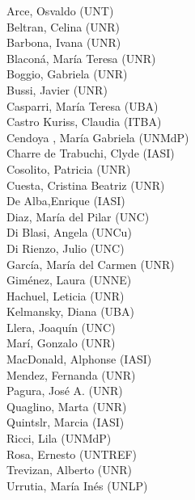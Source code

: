 \vspace{1cm}

{}
\bigbreak
\noindent Arce, Osvaldo (UNT) \\
Beltran, Celina (UNR) \\
Barbona, Ivana (UNR) \\
Blaconá, María Teresa (UNR) \\
Boggio, Gabriela (UNR) \\
Bussi, Javier (UNR) \\
Casparri, María Teresa (UBA) \\
Castro Kuriss, Claudia (ITBA) \\
Cendoya , María Gabriela (UNMdP) \\
Charre de Trabuchi, Clyde (IASI) \\
Cosolito, Patricia (UNR) \\
Cuesta, Cristina Beatriz (UNR) \\
De Alba,Enrique (IASI) \\
Diaz, María del Pilar (UNC) \\
Di Blasi, Angela (UNCu) \\
Di Rienzo, Julio (UNC) \\
García, María del Carmen (UNR) \\
Giménez, Laura (UNNE) \\
Hachuel, Leticia (UNR) \\
Kelmansky, Diana (UBA) \\
Llera, Joaquín (UNC) \\
Marí, Gonzalo (UNR) \\
MacDonald, Alphonse (IASI) \\
Mendez, Fernanda (UNR) \\
Pagura, José A. (UNR) \\
Quaglino, Marta (UNR) \\
Quintslr, Marcia (IASI) \\
Ricci, Lila (UNMdP) \\
Rosa, Ernesto (UNTREF) \\
Trevizan, Alberto (UNR) \\
Urrutia, María Inés (UNLP) \\


\newpage
\pagestyle{fancy}
\setlength\parindent{16pt}

